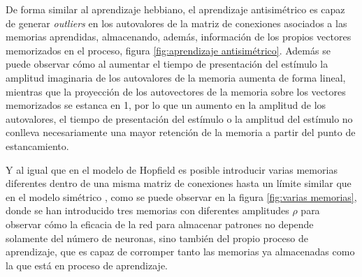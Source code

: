 \documentclass[11pt,a4paper,twoside,pdf]{article}
\numberwithin{equation}{section}
\begin{document}
De forma similar al aprendizaje hebbiano, el aprendizaje antisimétrico es capaz de generar \emph{outliers} en los autovalores de la matriz de conexiones asociados a las memorias aprendidas, almacenando, además, información de los propios vectores memorizados en el proceso, figura \ref{fig:aprendizaje antisimétrico}. Además se puede observar cómo al aumentar el tiempo de presentación del estímulo la amplitud imaginaria de los autovalores de la memoria aumenta de forma lineal, mientras que la proyección de los autovectores de la memoria sobre los vectores memorizados se estanca en 1, por lo que un aumento en la amplitud de los autovalores, el tiempo de presentación del estímulo o la amplitud del estímulo no conlleva necesariamente una mayor retención de la memoria a partir del punto de estancamiento. 

Y al igual que en el modelo de Hopfield es posible introducir varias memorias diferentes dentro de una misma matriz de conexiones hasta un límite similar que en el modelo simétrico \parencite{susman2019}, como se puede observar en la figura \ref{fig:varias memorias}, donde se han introducido tres memorias con diferentes amplitudes \(\rho\) para observar cómo la eficacia de la red para almacenar patrones no depende solamente del número de neuronas, sino también del propio proceso de aprendizaje, que es capaz de corromper tanto las memorias ya almacenadas como la que está en proceso de aprendizaje.
\end{document}
